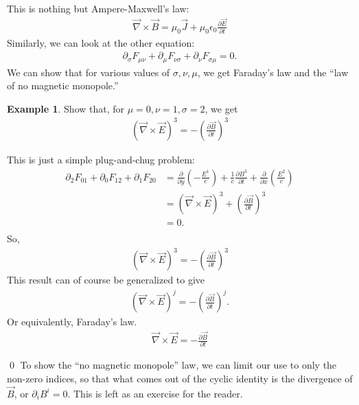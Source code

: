 \documentclass{book}
\theoremstyle{definition}
\newtheorem{exmp}{Example}[section]
\begin{document}
This is nothing but Ampere-Maxwell's law:
\begin{align*}
\boxed{\vec{\nabla}\times\vec{B} =  \mu_0 \vec{J} + \mu_0 \epsilon_0 \frac{\partial \vec{E}}{\partial t}}
\end{align*}
Similarly, we can look at the other equation:
\begin{align*}
\partial_\sigma F_{\mu\nu} + \partial_\mu F_{\nu\sigma} + \partial_\nu F_{\sigma\mu} = 0.
\end{align*}
We can show that for various values of $\sigma, \nu, \mu$, we get Faraday's law and the ``law of no magnetic monopole.''
\begin{exmp}
	Show that, for $\mu = 0, \nu = 1, \sigma = 2$, we get
	\begin{align*}
	\left( \vec{\nabla} \times \vec{E}\right) ^3  = -\left( 
	\frac{\partial \vec{B}}{\partial t} \right)^3
	\end{align*} 
	
	This is just a simple plug-and-chug problem:
	\begin{align*}
	\partial_2 F_{01} + \partial_0 F_{12} + \partial_1 F_{20}
	&= \frac{\partial}{\partial y}\left( -\frac{E^1}{c} \right) + \frac{1}{c}\frac{\partial B^3}{\partial t} + \frac{\partial }{\partial x}\left( \frac{E^2}{c} \right)\\
	&= \left( \vec{\nabla}\times\vec{E} \right)^3 + \left( \frac{\partial \vec{B}}{\partial t}\right)^3\\
	&= 0.\\
	\end{align*}
	So,
	\begin{align*}
	\left( \vec{\nabla} \times \vec{E}\right) ^3  = -\left( 
	\frac{\partial \vec{B}}{\partial t} \right)^3
	\end{align*}
	This result can of course be generalized to give
	\begin{align*}
	\left( \vec{\nabla} \times \vec{E}\right) ^j  = -\left( 
	\frac{\partial \vec{B}}{\partial t} \right)^j.
	\end{align*}
	Or equivalently, Faraday's law. 
	\begin{align*}
	\boxed{{\vec{\nabla} \times \vec{E}  = - 
	\frac{\partial \vec{B}}{\partial t}}}
	\end{align*}
\end{exmp}\qed
To show the ``no magnetic monopole'' law, we can limit our use to only the non-zero indices, so that what comes out of the cyclic identity is the divergence of $\vec{B}$, or $\partial_i B^i = 0$. This is left as an exercise for the reader. \\
\end{document}
